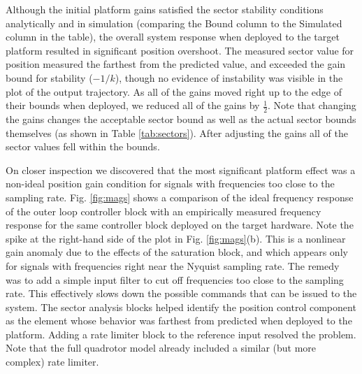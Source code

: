 Although the initial platform gains satisfied the sector stability conditions analytically and in simulation (comparing the Bound column to the Simulated column in the table), the overall system response when deployed to the target platform resulted in significant position overshoot.  The 
measured sector value for position measured the farthest from the predicted value, and exceeded the gain bound for stability ($-1/k$), though no evidence of instability was visible in the plot of the output trajectory.  As all of the gains moved right up to the edge of their bounds when deployed, we reduced all of the gains by $\frac{1}{2}$. Note that changing the gains changes the acceptable sector bound as well as the actual sector bounds themselves (as shown in Table \ref{tab:sectors}).  After adjusting the gains all of the sector values fell within the bounds.

On closer inspection we discovered that the most significant platform effect was a non-ideal position gain condition for signals with frequencies too close to the sampling rate.  Fig. \ref{fig:mags} shows a comparison of the ideal frequency response of the outer loop controller block with an empirically measured frequency response for the same controller
block deployed on the target hardware. Note the spike at the right-hand side of the plot in Fig. \ref{fig:mags}(b).  This is a nonlinear gain anomaly due to the effects of the saturation block, and which appears only for signals with frequencies right near the Nyquist sampling rate. The remedy was to add a simple input filter to cut off frequencies too close to the sampling rate. This effectively slows down the possible commands that can be issued to the system. The sector analysis blocks helped identify the position control component as the element whose behavior was farthest from predicted when 
deployed to the platform.   Adding a rate limiter block to the reference input resolved the problem.  Note that the full quadrotor model already included a 
similar (but more complex) rate limiter.

